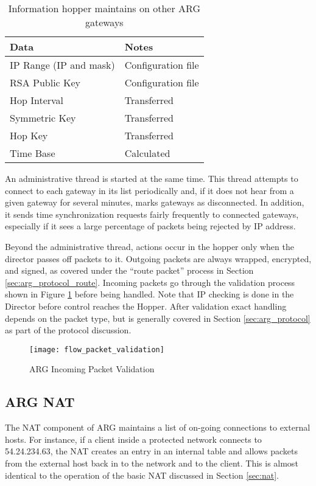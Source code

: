 \begin{table}
\caption{Information hopper maintains on other ARG gateways}
\label{tab:gatestate}
\centering
\begin{tabular}{l|l}
	\textbf{Data} & \textbf{Notes } \\
	\hline
	IP Range (IP and mask) & Configuration file \\
	\ac{RSA} Public Key & Configuration file \\
	Hop Interval & Transferred \\
	Symmetric Key & Transferred \\
	Hop Key & Transferred \\
	Time Base & Calculated \\
\end{tabular}
\end{table}

\par An administrative thread is started at the same time. This thread attempts to connect to each gateway in its list periodically and, if it does not hear from a given gateway for several minutes, marks gateways as disconnected. In addition, it sends time synchronization requests fairly frequently to connected gateways, especially if it sees a large percentage of packets being rejected by \ac{IP} address. 

\par Beyond the administrative thread, actions occur in the hopper only when the director passes off packets to it. Outgoing packets are always wrapped, encrypted, and signed, as covered under the ``route packet'' process in Section \ref{sec:arg_protocol_route}. Incoming packets go through the validation process shown in Figure \ref{fig:arg_hopper_in_validation} before being handled. Note that \ac{IP} checking is done in the Director before control reaches the Hopper. After validation exact handling depends on the packet type, but is generally covered in Section \ref{sec:arg_protocol} as part of the protocol discussion.

\begin{figure}
\caption{\ac{ARG} Incoming Packet Validation}
\label{fig:arg_hopper_in_validation}
\centering
\texttt{[image: flow\_packet\_validation]}
\end{figure}

\subsection{\ac{ARG} \ac{NAT}}
\label{sec:arg_nat}
\par The \ac{NAT} component of \ac{ARG} maintains a list of on-going connections to external hosts. For instance, if a client inside a protected network connects to 54.24.234.63, the \ac{NAT} creates an entry in an internal table and allows packets from the external host back in to the network and to the client. This is almost identical to the operation of the basic \ac{NAT} discussed in Section \ref{sec:nat}.

